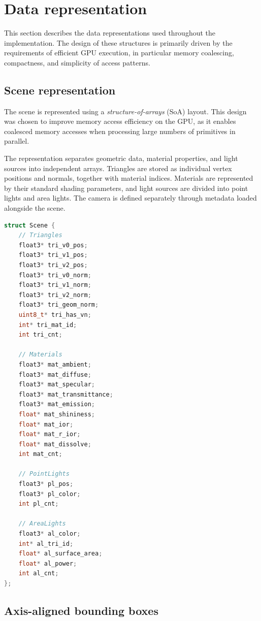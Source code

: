 \section{Data representation}

This section describes the data representations used throughout the implementation. The design of these structures is primarily driven by the requirements of efficient GPU execution, in particular memory coalescing, compactness, and simplicity of access patterns.

\subsection{Scene representation}

The scene is represented using a \textit{structure-of-arrays} (SoA) layout. This design was chosen to improve memory access efficiency on the GPU, as it enables coalesced memory accesses when processing large numbers of primitives in parallel.

The representation separates geometric data, material properties, and light sources into independent arrays. Triangles are stored as individual vertex positions and normals, together with material indices. Materials are represented by their standard shading parameters, and light sources are divided into point lights and area lights. The camera is defined separately through metadata loaded alongside the scene.

\begin{lstlisting}[language=C++, caption=Scene representation]
struct Scene {
    // Triangles
    float3* tri_v0_pos;
    float3* tri_v1_pos;
    float3* tri_v2_pos;
    float3* tri_v0_norm;
    float3* tri_v1_norm;
    float3* tri_v2_norm;
    float3* tri_geom_norm;
    uint8_t* tri_has_vn;
    int* tri_mat_id;
    int tri_cnt;

    // Materials
    float3* mat_ambient;
    float3* mat_diffuse;
    float3* mat_specular;
    float3* mat_transmittance;
    float3* mat_emission;
    float* mat_shininess;
    float* mat_ior;
    float* mat_r_ior;
    float* mat_dissolve;
    int mat_cnt;

    // PointLights
    float3* pl_pos;
    float3* pl_color;
    int pl_cnt;

    // AreaLights
    float3* al_color;
    int* al_tri_id;
    float* al_surface_area;
    float* al_power;
    int al_cnt;
};
\end{lstlisting}

\subsection{Axis-aligned bounding boxes}

